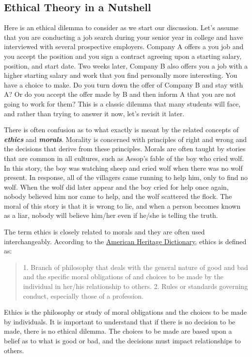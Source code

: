 \subsection{Ethical Theory in a
Nutshell}\label{ethical-theory-in-a-nutshell}

Here is an ethical dilemma to consider as we start our discussion. Let's
assume that you are conducting a job search during your senior year in
college and have interviewed with several prospective employers. Company
A offers a you job and you accept the position and you sign a contract
agreeing upon a starting salary, position, and start date. Two weeks
later, Company B also offers you a job with a higher starting salary and
work that you find personally more interesting. You have a choice to
make. Do you turn down the offer of Company B and stay with A? Or do you
accept the offer made by B and then inform A that you are not going to
work for them? This is a classic dilemma that many students will face,
and rather than trying to answer it now, let's revisit it later.

There is often confusion as to what exactly is meant by the related
concepts of \emph{\textbf{ethics}} and \emph{\textbf{morals}}. Morality
is concerned with principles of right and wrong and the decisions that
derive from these principles. Morals are often taught by stories that
are common in all cultures, such as Aesop's fable of the boy who cried
wolf. In this story, the boy was watching sheep and cried wolf when
there was no wolf present. In response, all of the villagers came
running to help him, only to find no wolf. When the wolf did later
appear and the boy cried for help once again, nobody believed him nor
came to help, and the wolf scattered the flock. The moral of this story
is that it is wrong to lie, and when a person becomes known as a liar,
nobody will believe him/her even if he/she is telling the truth.

The term ethics is closely related to morals and they are often used
interchangeably. According to the \ul{American Heritage Dictionary},
ethics is defined as:

\begin{quote}
1. Branch of philosophy that deals with the general nature of good and
bad and the specific moral obligations of and choices to be made by the
individual in her/his relationship to others. 2. Rules or standards
governing conduct, especially those of a profession.
\end{quote}

Ethics is the philosophy or study of moral obligations and the choices
to be made by individuals. It is important to understand that if there
is no decision to be made, there is no ethical dilemma. The choices to
be made are based upon a belief as to what is good or bad, and the
decisions must impact relationships to others.

